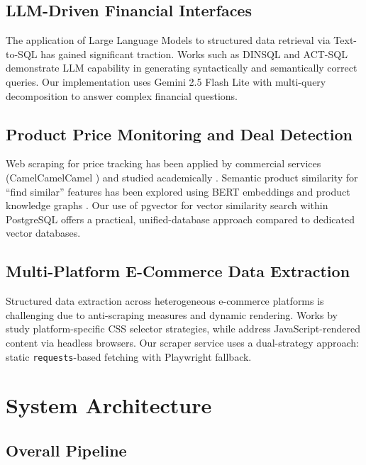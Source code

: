 \documentclass[]{IEEEtran}
\begin{document}
\subsection{LLM-Driven Financial Interfaces}
The application of Large Language Models to structured data retrieval via Text-to-SQL \cite{yu2018spider} has gained significant traction. Works such as DINSQL \cite{pourreza2023} and ACT-SQL \cite{zhang2023act} demonstrate LLM capability in generating syntactically and semantically correct queries. Our implementation uses Gemini 2.5 Flash Lite with multi-query decomposition to answer complex financial questions.

\subsection{Product Price Monitoring and Deal Detection}
Web scraping for price tracking has been applied by commercial services (CamelCamelCamel \cite{camel2024}) and studied academically \cite{chen2016product}. Semantic product similarity for ``find similar'' features has been explored using BERT embeddings \cite{devlin2018} and product knowledge graphs \cite{xu2020product}. Our use of pgvector \cite{pgvector2024} for vector similarity search within PostgreSQL offers a practical, unified-database approach compared to dedicated vector databases.

\subsection{Multi-Platform E-Commerce Data Extraction}
Structured data extraction across heterogeneous e-commerce platforms is challenging due to anti-scraping measures and dynamic rendering. Works by \cite{mazloom2022} study platform-specific CSS selector strategies, while \cite{vosecky2019} address JavaScript-rendered content via headless browsers. Our scraper service uses a dual-strategy approach: static \texttt{requests}-based fetching with Playwright fallback.

\section{System Architecture}
\label{sec:arch}

\subsection{Overall Pipeline}
\end{document}
